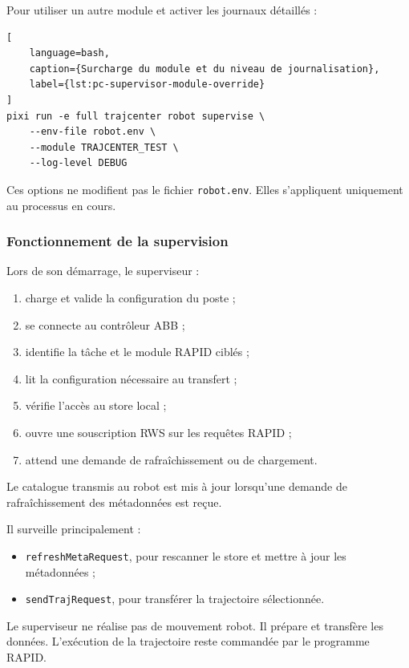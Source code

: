 \documentclass{rapportENSAM}
\begin{document}
Pour utiliser un autre module et activer les journaux détaillés :

\begin{lstlisting}[
    language=bash,
    caption={Surcharge du module et du niveau de journalisation},
    label={lst:pc-supervisor-module-override}
]
pixi run -e full trajcenter robot supervise \
    --env-file robot.env \
    --module TRAJCENTER_TEST \
    --log-level DEBUG
\end{lstlisting}

Ces options ne modifient pas le fichier \texttt{robot.env}. Elles s'appliquent
uniquement au processus en cours.

\subsubsection{Fonctionnement de la supervision}
\label{subsubsec:pc-supervisor-operation}

Lors de son démarrage, le superviseur :

\begin{enumerate}
    \item charge et valide la configuration du poste ;
    \item se connecte au contrôleur ABB ;
    \item identifie la tâche et le module RAPID ciblés ;
    \item lit la configuration nécessaire au transfert ;
    \item vérifie l'accès au store local ;
    \item ouvre une souscription RWS sur les requêtes RAPID ;
    \item attend une demande de rafraîchissement ou de chargement.
\end{enumerate}

Le catalogue transmis au robot est mis à jour lorsqu'une demande de rafraîchissement des métadonnées est reçue.


Il surveille principalement :

\begin{itemize}
    \item \texttt{refreshMetaRequest}, pour rescanner le store et mettre à
    jour les métadonnées ;
    \item \texttt{sendTrajRequest}, pour transférer la trajectoire
    sélectionnée.
\end{itemize}

Le superviseur ne réalise pas de mouvement robot. Il prépare et transfère les
données. L'exécution de la trajectoire reste commandée par le programme RAPID.
\end{document}
